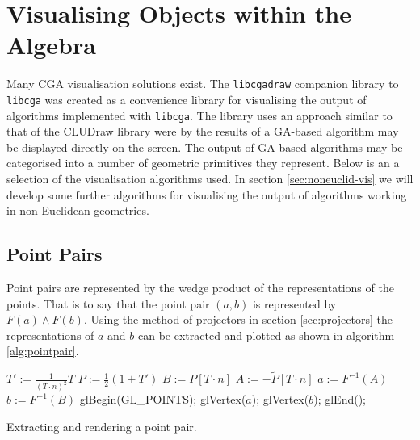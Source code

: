 



\section{Visualising Objects within the Algebra}

Many CGA visualisation solutions exist\cite{CLU}. The {\tt libcgadraw}
companion library to {\tt libcga} was created as a convenience library
for visualising the output of algorithms implemented with
{\tt libcga}. The library
uses an approach similar to that of the CLUDraw library were by the results of 
a GA-based algorithm may be displayed directly on the screen.
The output of GA-based algorithms may be categorised into a number of
geometric primitives they represent. Below is an a selection of the
visualisation algorithms used. In section \ref{sec:noneuclid-vis} we will
develop some further algorithms for visualising the output of algorithms
working in non Euclidean geometries.

\subsection{Point Pairs}

Point pairs are represented by the wedge product of the representations of the
points. That is to say that the point pair $(a,b)$ is represented by $F(a) \wedge F(b)$.
Using the method of projectors in section \ref{sec:projectors} the representations
of $a$ and $b$ can be extracted and plotted as shown in algorithm \ref{alg:pointpair}.

\begin{fancyalg}
\begin{algorithmic}[1]
\STATE $T' := \frac{1}{(T \cdot n)^2} T$
\STATE $P := \frac{1}{2}(1+T')$
\STATE $B := P \left[ T\cdot n \right]$
\STATE $A := - \tilde{P} \left[ T \cdot n \right]$
\STATE $a := F^{-1}(A)$
\STATE $b := F^{-1}(B)$
\STATE glBegin(GL\_POINTS);
\STATE glVertex($a$); glVertex($b$);
\STATE glEnd();
\end{algorithmic}
\caption{\label{alg:pointpair}Extracting and rendering a point pair.}
\end{fancyalg}

